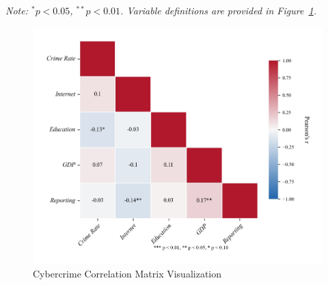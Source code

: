         \noindent \textit{Note: \(^*p < 0.05\), \(^{**}p < 0.01\). Variable definitions are provided in Figure~\ref{fig:correlation-matrix}.}

        \begin{figure}
            \centering
            \includegraphics[width=0.75\linewidth]{../rsrc/demographics/correlation_matrix}
            \caption{Cybercrime Correlation Matrix Visualization}\label{fig:correlation-matrix}
        \end{figure}
